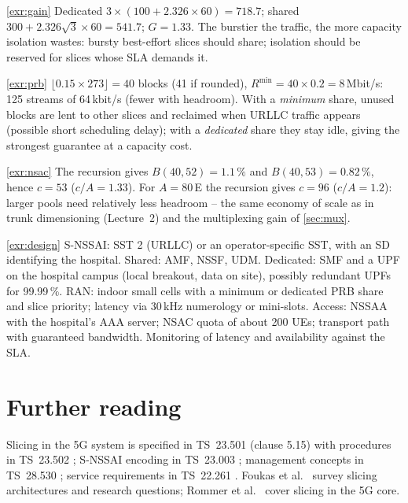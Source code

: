 \documentclass[11pt,a4paper]{article}
\begin{document}
\begin{solutionbox}{\ref{exr:gain}}
Dedicated $3\times(100 + 2.326\times60) = 718.7$; shared $300 + 2.326\sqrt3\times60 = 541.7$; $G = 1.33$. The burstier the traffic, the more capacity
isolation wastes: bursty best-effort slices should share; isolation should be reserved for slices whose SLA demands it.
\end{solutionbox}

\begin{solutionbox}{\ref{exr:prb}}
$\lfloor0.15\times273\rfloor = 40$ blocks (41 if rounded), $R^{\min} = 40\times0.2 = 8$\,Mbit/s: 125 streams of 64\,kbit/s (fewer with headroom). With a
\emph{minimum} share, unused blocks are lent to other slices and reclaimed when URLLC traffic appears (possible short scheduling delay); with a
\emph{dedicated} share they stay idle, giving the strongest guarantee at a capacity cost.
\end{solutionbox}

\begin{solutionbox}{\ref{exr:nsac}}
The recursion gives $B(40,52) = 1.1\,\%$ and $B(40,53) = 0.82\,\%$, hence $c = 53$ ($c/A = 1.33$). For $A = 80$\,E the recursion gives $c = 96$ ($c/A = 1.2$):
larger pools need relatively less headroom -- the same economy of scale as in trunk dimensioning (Lecture~2) and the multiplexing gain of \cref{sec:mux}.
\end{solutionbox}

\begin{solutionbox}{\ref{exr:design}}
S-NSSAI: SST 2 (URLLC) or an operator-specific SST, with an SD identifying the hospital. Shared: AMF, NSSF, UDM. Dedicated: SMF and a UPF on the hospital campus
(local breakout, data on site), possibly redundant UPFs for 99.99\,\%. RAN: indoor small cells with a minimum or dedicated PRB share and slice priority; latency
via 30\,kHz numerology or mini-slots. Access: NSSAA with the hospital's AAA server; NSAC quota of about 200 UEs; transport path with guaranteed bandwidth. Monitoring
of latency and availability against the SLA.
\end{solutionbox}

\section{Further reading}
Slicing in the 5G system is specified in TS~23.501 \cite{ts23501} (clause 5.15) with procedures in TS~23.502 \cite{ts23502}; S-NSSAI encoding in TS~23.003
\cite{ts23003}; management concepts in TS~28.530 \cite{ts28530}; service requirements in TS~22.261 \cite{ts22261}. Foukas et al.\ \cite{foukas2017slicing} survey
slicing architectures and research questions; Rommer et al.\ \cite{rommer2020core} cover slicing in the 5G core.

\printbibliography[heading=subbibliography,title={\ACNstrRefs}]
\end{document}
